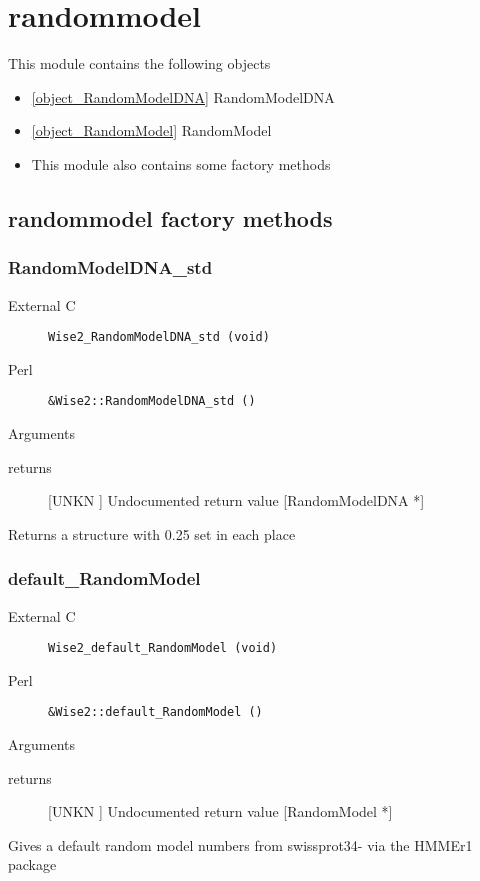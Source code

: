 \section{randommodel}
\label{module_randommodel}
This module contains the following objects

\begin{itemize}
\item \ref{object_RandomModelDNA} RandomModelDNA

\item \ref{object_RandomModel} RandomModel

\item This module also contains some factory methods
\end{itemize}
\subsection{randommodel factory methods}
\subsubsection{RandomModelDNA_std}
\begin{description}
\item[External C] {\tt Wise2_RandomModelDNA_std (void)}
\item[Perl] {\tt &Wise2::RandomModelDNA_std ()}

\end{description}
Arguments
\begin{description}
\item[returns] [UNKN ] Undocumented return value [RandomModelDNA *]
\end{description}
Returns a structure with 0.25 set in each place


\subsubsection{default_RandomModel}
\begin{description}
\item[External C] {\tt Wise2_default_RandomModel (void)}
\item[Perl] {\tt &Wise2::default_RandomModel ()}

\end{description}
Arguments
\begin{description}
\item[returns] [UNKN ] Undocumented return value [RandomModel *]
\end{description}
Gives a default random model numbers from
swissprot34- via the HMMEr1 package




